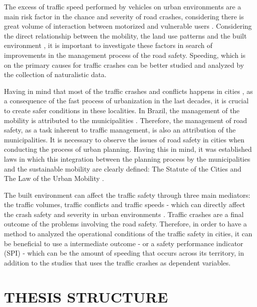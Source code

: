 The excess of traffic speed performed by vehicles on urban environments are a main risk factor in the chance and severity of road crashes, considering there is great volume of interaction between motorized and vulnerable users \cite{Elvik2009}. Considering the direct relationship between the mobility, the land use patterns and the built environment \cite{DeVos2013}, it is important to investigate these factors in search of improvements in the management process of the road safety. Speeding, which is on the primary causes for traffic crashes \cite{WHO2013} can be better studied and analyzed by the collection of naturalistic data.

Having in mind that most of the traffic crashes and conflicts happens in cities \cite{WHO2018}, as a consequence of the fast process of urbanization in the last decades, it is crucial to create safer conditions in these localities. In Brazil, the management of the mobility is attributed to the municipalities \cite{Brasil1997}. Therefore, the management of road safety, as a task inherent to traffic management, is also an attribution of the municipalities. It is necessary to observe the issues of road safety in cities when conducting the process of urban planning. Having this in mind, it was established laws in which this integration between the planning process by the municipalities and the sustainable mobility are clearly defined: The Statute of the Cities \cite{Brasil2001} and The Law of the Urban Mobility \cite{Brasil2012}.    

The built environment can affect the traffic safety through three main mediators: the traffic volumes, traffic conflicts and traffic speeds - which can directly affect the crash safety and severity in urban environments \cite{Ewing2009}. Traffic crashes are a final outcome of the problems involving the road safety. Therefore, in order to have a method to analyzed the operational conditions of the traffic safety in cities, it can be beneficial to use a intermediate outcome - or a safety performance indicator (SPI) \cite{Bastos2014} - which can be the amount of speeding that occurs across its territory, in addition to the studies that uses the traffic crashes as dependent variables. 

\section{THESIS STRUCTURE}


